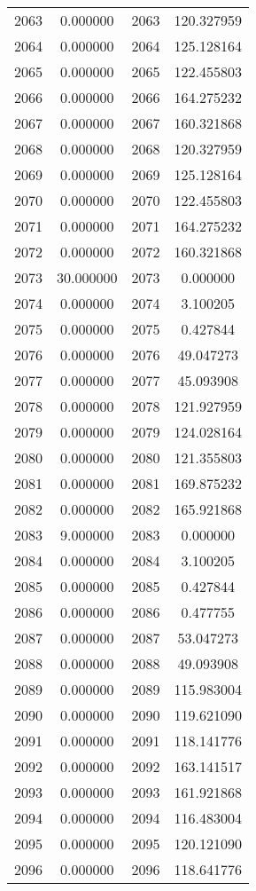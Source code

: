 \documentclass[12pt]{article}
\begin{document}
\begin{longtable}{@{}cccc@{}}
2063 & 0.000000 & 2063 & 120.327959 \\
2064 & 0.000000 & 2064 & 125.128164 \\
2065 & 0.000000 & 2065 & 122.455803 \\
2066 & 0.000000 & 2066 & 164.275232 \\
2067 & 0.000000 & 2067 & 160.321868 \\
2068 & 0.000000 & 2068 & 120.327959 \\
2069 & 0.000000 & 2069 & 125.128164 \\
2070 & 0.000000 & 2070 & 122.455803 \\
2071 & 0.000000 & 2071 & 164.275232 \\
2072 & 0.000000 & 2072 & 160.321868 \\
2073 & 30.000000 & 2073 & 0.000000 \\
2074 & 0.000000 & 2074 & 3.100205 \\
2075 & 0.000000 & 2075 & 0.427844 \\
2076 & 0.000000 & 2076 & 49.047273 \\
2077 & 0.000000 & 2077 & 45.093908 \\
2078 & 0.000000 & 2078 & 121.927959 \\
2079 & 0.000000 & 2079 & 124.028164 \\
2080 & 0.000000 & 2080 & 121.355803 \\
2081 & 0.000000 & 2081 & 169.875232 \\
2082 & 0.000000 & 2082 & 165.921868 \\
2083 & 9.000000 & 2083 & 0.000000 \\
2084 & 0.000000 & 2084 & 3.100205 \\
2085 & 0.000000 & 2085 & 0.427844 \\
2086 & 0.000000 & 2086 & 0.477755 \\
2087 & 0.000000 & 2087 & 53.047273 \\
2088 & 0.000000 & 2088 & 49.093908 \\
2089 & 0.000000 & 2089 & 115.983004 \\
2090 & 0.000000 & 2090 & 119.621090 \\
2091 & 0.000000 & 2091 & 118.141776 \\
2092 & 0.000000 & 2092 & 163.141517 \\
2093 & 0.000000 & 2093 & 161.921868 \\
2094 & 0.000000 & 2094 & 116.483004 \\
2095 & 0.000000 & 2095 & 120.121090 \\
2096 & 0.000000 & 2096 & 118.641776 \\

\end{longtable}
\end{document}
